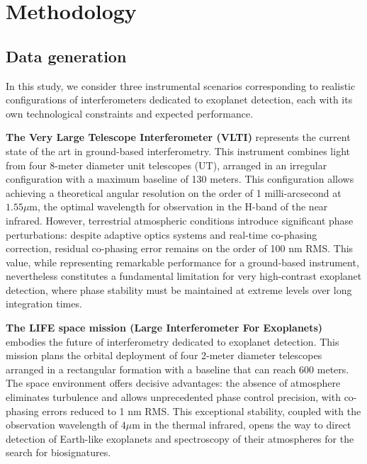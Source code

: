 \documentclass{article}
\begin{document}
\section{Methodology}



\subsection{Data generation}

In this study, we consider three instrumental scenarios corresponding to realistic configurations of interferometers dedicated to exoplanet detection, each with its own technological constraints and expected performance.

\textbf{The Very Large Telescope Interferometer (VLTI)} represents the current state of the art in ground-based interferometry. This instrument combines light from four 8-meter diameter unit telescopes (UT), arranged in an irregular configuration with a maximum baseline of 130 meters. This configuration allows achieving a theoretical angular resolution on the order of 1 milli-arcsecond at $1.55\mu$m, the optimal wavelength for observation in the H-band of the near infrared. However, terrestrial atmospheric conditions introduce significant phase perturbations: despite adaptive optics systems and real-time co-phasing correction, residual co-phasing error remains on the order of 100 nm RMS. This value, while representing remarkable performance for a ground-based instrument, nevertheless constitutes a fundamental limitation for very high-contrast exoplanet detection, where phase stability must be maintained at extreme levels over long integration times.

\textbf{The LIFE space mission (Large Interferometer For Exoplanets)} embodies the future of interferometry dedicated to exoplanet detection. This mission plans the orbital deployment of four 2-meter diameter telescopes arranged in a rectangular formation with a baseline that can reach 600 meters. The space environment offers decisive advantages: the absence of atmosphere eliminates turbulence and allows unprecedented phase control precision, with co-phasing errors reduced to 1 nm RMS. This exceptional stability, coupled with the observation wavelength of $4\mu$m in the thermal infrared, opens the way to direct detection of Earth-like exoplanets and spectroscopy of their atmospheres for the search for biosignatures.
\end{document}

